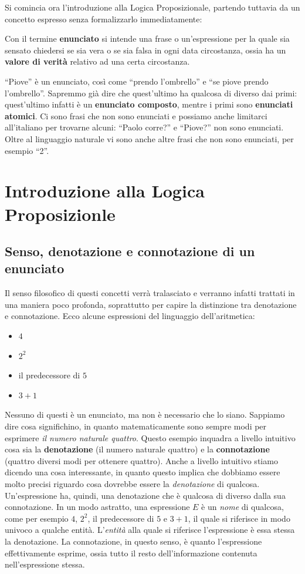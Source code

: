 Si comincia ora l'introduzione alla Logica Proposizionale, 
partendo tuttavia da un concetto espresso senza formalizzarlo immediatamente: 
\begin{defi}[Enunciato]
Con il termine \textbf{enunciato} si intende una frase o un'espressione per la 
quale sia sensato chiedersi se sia vera o se sia falsa in ogni data 
circostanza, ossia ha un \textbf{valore di verità} relativo ad una 
certa circostanza. 
\end{defi}
``Piove'' è un enunciato, così come ``prendo l'ombrello'' 
e ``se piove prendo l'ombrello''. Sapremmo già dire che quest'ultimo ha 
qualcosa di diverso dai primi: quest'ultimo infatti è un \textbf{enunciato 
composto}, mentre i primi sono \textbf{enunciati atomici}. Ci sono frasi 
che non sono enunciati e possiamo anche limitarci all'italiano per trovarne 
alcuni: ``Paolo corre?'' e ``Piove?'' non sono enunciati. Oltre al linguaggio naturale 
vi sono anche altre frasi che non sono enunciati, per esempio ``2''. 

\section{Introduzione alla Logica Proposizionle}
\subsection{Senso, denotazione e connotazione di un enunciato}
Il senso filosofico di questi concetti verrà tralasciato e verranno infatti 
trattati in una maniera poco profonda, soprattutto per capire la distinzione
tra denotazione e connotazione. Ecco alcune espressioni del linguaggio 
dell'aritmetica: 
\begin{itemize}
  \setlength\itemsep{0pt}
  \item $4$
  \item $2^2$
  \item il predecessore di $5$ 
  \item $3+1$
\end{itemize}
Nessuno di questi è un enunciato, ma non è necessario che lo siano. 
Sappiamo dire cosa significhino, in quanto matematicamente sono sempre 
modi per esprimere \textit{il numero naturale quattro}. Questo esempio inquadra 
a livello intuitivo cosa sia la \textbf{denotazione} (il numero naturale 
quattro) e la \textbf{connotazione} (quattro diversi modi per ottenere quattro). 
Anche a livello intuitivo stiamo dicendo una cosa interessante, in quanto 
questo implica che dobbiamo essere molto precisi riguardo cosa dovrebbe
essere la \textit{denotazione} di qualcosa. 
Un'espressione ha, quindi, una denotazione che è qualcosa di diverso dalla 
sua connotazione. In un modo astratto, una espressione $E$ è un \textit{nome}
di qualcosa, come per esempio $4$, $2^2$, il predecessore di $5$ e $3+1$, 
il quale si riferisce in modo univoco a qualche entità. L'\textit{entità} alla 
quale si riferisce l'espressione è 
essa stessa la denotazione. La connotazione, in questo senso, è quanto 
l'espressione effettivamente esprime, ossia tutto il resto dell'informazione 
contenuta nell'espressione stessa. 

